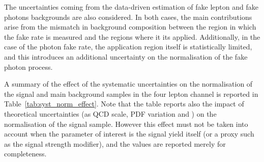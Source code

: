 
The uncertainties coming from the data-driven estimation of fake lepton and fake photons backgrounds are also considered.
In both cases, the main contributions arise from the mismatch in background composition between the region in which the fake rate is measured and the regions where it its applied.
Additionally, in the case of the photon fake rate, the application region itself is statistically limited, and this introduces an additional uncertainty on the normalisation of the fake photon process.

A summary of the effect of the systematic uncertainties on the normalisation
of the signal and main background samples in the four lepton channel is reported in Table~\ref{tab:syst_norm_effect}.
Note that the table reports also the impact of theoretical uncertainties
(\ie as QCD scale, PDF variation and \alpS) on the normalisation of the signal sample.
However this effect must not be taken into account when the parameter of interest is the
signal yield itself (or a proxy such as the signal strength modifier),
and the values are reported merely for completeness.

